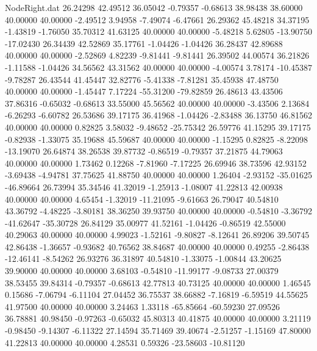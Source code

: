 \begin{filecontents}{NodeRight.dat}
  26.24298   42.49512   36.05042    -0.79357   -0.68613   38.98438   38.60000   40.00000   40.00000   -2.49512    3.94958   -7.49074   -6.47661
  26.29362   45.48218   34.37195    -1.43819   -1.76050   35.70312   41.63125   40.00000   40.00000   -5.48218    5.62805  -13.90750  -17.02430
  26.34439   42.52869   35.17761    -1.04426   -1.04426   36.28437   42.89688   40.00000   40.00000   -2.52869    4.82239   -9.81441   -9.81441
  26.39502   44.00574   36.21826    -1.11588   -1.04426   34.56562   43.31562   40.00000   40.00000   -4.00574    3.78174  -10.45387   -9.78287
  26.43544   41.45447   32.82776    -5.41338   -7.81281   35.45938   47.48750   40.00000   40.00000   -1.45447    7.17224  -55.31200  -79.82859
  26.48613   43.43506   37.86316    -0.65032   -0.68613   33.55000   45.56562   40.00000   40.00000   -3.43506    2.13684   -6.26293   -6.60782
  26.53686   39.17175   36.41968    -1.04426   -2.83488   36.13750   46.81562   40.00000   40.00000    0.82825    3.58032   -9.48652  -25.75342
  26.59776   41.15295   39.17175    -0.82938   -1.33075   35.19688   45.59687   40.00000   40.00000   -1.15295    0.82825   -8.22098  -13.19070
  26.64874   38.26538   39.87732    -0.86519   -0.79357   37.21875   44.79063   40.00000   40.00000    1.73462    0.12268   -7.81960   -7.17225
  26.69946   38.73596   42.93152    -3.69438   -4.94781   37.75625   41.88750   40.00000   40.00000    1.26404   -2.93152  -35.01625  -46.89664
  26.73994   35.34546   41.32019    -1.25913   -1.08007   41.22813   42.00938   40.00000   40.00000    4.65454   -1.32019  -11.21095   -9.61663
  26.79047   40.54810   43.36792    -4.48225   -3.80181   38.36250   39.93750   40.00000   40.00000   -0.54810   -3.36792  -41.62647  -35.30728
  26.84129   35.00977   41.52161    -1.04426   -0.86519   42.55000   40.29063   40.00000   40.00000    4.99023   -1.52161   -9.80827   -8.12641
  26.89206   39.50745   42.86438    -1.36657   -0.93682   40.76562   38.84687   40.00000   40.00000    0.49255   -2.86438  -12.46141   -8.54262
  26.93276   36.31897   40.54810    -1.33075   -1.00844   43.20625   39.90000   40.00000   40.00000    3.68103   -0.54810  -11.99177   -9.08733
  27.00379   38.53455   39.84314    -0.79357   -0.68613   42.77813   40.73125   40.00000   40.00000    1.46545    0.15686   -7.06794   -6.11104
  27.04452   36.75537   38.66882    -7.16819   -6.59519   44.55625   41.97500   40.00000   40.00000    3.24463    1.33118  -65.85664  -60.59230
  27.09526   36.78881   40.98450    -0.97263   -0.65032   45.80313   40.41875   40.00000   40.00000    3.21119   -0.98450   -9.14307   -6.11322
  27.14594   35.71469   39.40674    -2.51257   -1.15169   47.80000   41.22813   40.00000   40.00000    4.28531    0.59326  -23.58603  -10.81120

\end{filecontents}
